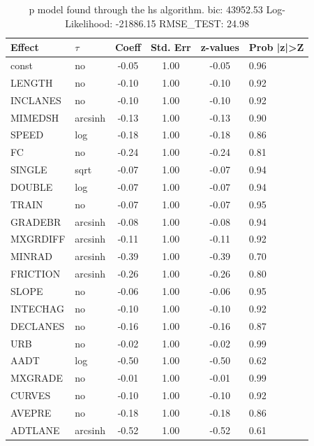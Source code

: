 \begin{table}
	\caption{p model found through the hs algorithm. bic: 43952.53 Log-Likelihood: -21886.15 RMSE_TEST: 24.98}
	\begin{center}
		\begin{tabular}{|l|l|c|c|c|l|}
			\hline
			Effect & $\tau$ & Coeff & Std. Err & z-values & Prob |z|>Z \\
			\hline
			const & no & -0.05 & 1.00 & -0.05 & 0.96 \\
			\hline
			LENGTH & no & -0.10 & 1.00 & -0.10 & 0.92 \\
			\hline
			INCLANES & no & -0.10 & 1.00 & -0.10 & 0.92 \\
			\hline
			MIMEDSH & arcsinh & -0.13 & 1.00 & -0.13 & 0.90 \\
			\hline
			SPEED & log & -0.18 & 1.00 & -0.18 & 0.86 \\
			\hline
			FC & no & -0.24 & 1.00 & -0.24 & 0.81 \\
			\hline
			SINGLE & sqrt & -0.07 & 1.00 & -0.07 & 0.94 \\
			\hline
			DOUBLE & log & -0.07 & 1.00 & -0.07 & 0.94 \\
			\hline
			TRAIN & no & -0.07 & 1.00 & -0.07 & 0.95 \\
			\hline
			GRADEBR & arcsinh & -0.08 & 1.00 & -0.08 & 0.94 \\
			\hline
			MXGRDIFF & arcsinh & -0.11 & 1.00 & -0.11 & 0.92 \\
			\hline
			MINRAD & arcsinh & -0.39 & 1.00 & -0.39 & 0.70 \\
			\hline
			FRICTION & arcsinh & -0.26 & 1.00 & -0.26 & 0.80 \\
			\hline
			SLOPE & no & -0.06 & 1.00 & -0.06 & 0.95 \\
			\hline
			INTECHAG & no & -0.10 & 1.00 & -0.10 & 0.92 \\
			\hline
			DECLANES & no & -0.16 & 1.00 & -0.16 & 0.87 \\
			\hline
			URB & no & -0.02 & 1.00 & -0.02 & 0.99 \\
			\hline
			AADT & log & -0.50 & 1.00 & -0.50 & 0.62 \\
			\hline
			MXGRADE & no & -0.01 & 1.00 & -0.01 & 0.99 \\
			\hline
			CURVES & no & -0.10 & 1.00 & -0.10 & 0.92 \\
			\hline
			AVEPRE & no & -0.18 & 1.00 & -0.18 & 0.86 \\
			\hline
			ADTLANE & arcsinh & -0.52 & 1.00 & -0.52 & 0.61 \\
			\hline

\end{tabular}
\end{center}
\end{table}
